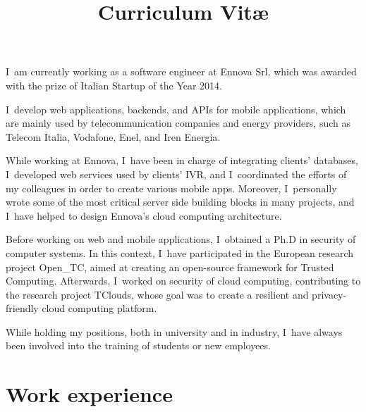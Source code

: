 \documentclass[a4paper,sans]{moderncv} %
\title{Curriculum Vit\ae}
\newcommand{\experience}{Experience}
\newcommand{\otc}{Open\_TC}
\renewcommand{\experience}{Esperienze di lavoro}
\renewcommand{\experience}{Work experience}
\begin{document}
\maketitle

\justify
I~am currently working as a software engineer at Ennova Srl,
  which was awarded with the prize of Italian Startup of the Year 2014.

  I~develop web applications, backends, and APIs for mobile applications,
  which are mainly used by telecommunication companies and energy providers,
  such as Telecom Italia, Vodafone, Enel, and Iren Energia.

  While working at Ennova, I~have been in charge of integrating clients' databases,
  I~developed web services used by clients’ IVR,
  and I~coordinated the efforts of my colleagues in order to create various mobile apps.
  Moreover, I~personally wrote some of the most critical server side building blocks in many projects,
  and I~have helped to design Ennova's cloud computing architecture.

  Before working on web and mobile applications, I~obtained a Ph.D in security of computer systems.
  In this context, I~have participated in the European research project \otc,
  aimed at creating an open-source framework for Trusted Computing.
  Afterwards, I~worked on security of cloud computing, contributing to the research project TClouds,
  whose goal was to create a resilient and privacy-friendly cloud computing platform.

  While holding my positions, both in university and in industry,
  I~have always been involved into the training of students or new employees.

  \section{\experience}

\end{document}
